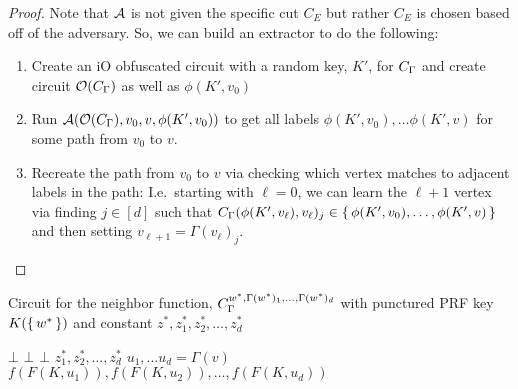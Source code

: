 \begin{lemma}
\begin{proof}
		Note that $\mathcal{A}$ is not given the specific cut $C_E$ but rather $C_E$ is chosen based off of the adversary.
		So, we can build an extractor to do the following:
		\begin{enumerate}
			\item Create an iO obfuscated circuit with a random key, $K'$, for $C_\Gamma$ and create circuit $\mathcal{O}(C_\Gamma)$
			as well as $\phi(K', v_0)$
			\item Run $\mathcal{A}(\mathcal{O}(C_\Gamma), v_0, v, \phi(K', v_0))$ to get all labels $\phi(K', v_0), \dots \phi(K', v)$
			for some path from $v_0$ to $v$.
			\item Recreate the path from $v_0$ to $v$ via checking which vertex matches to adjacent labels in the path:
			I.e.\ starting with $\ell = 0$, we can learn the $\ell + 1$ vertex via finding $j \in [d]$ such that
			$C_\Gamma(\phi(K', v_\ell), v_\ell)_j \in \set{\phi(K', v_0), \dots, \phi(K', v)}$
			 and then setting $v_{\ell + 1} = \Gamma(v_\ell)_j$.
		\end{enumerate}
	\end{proof}
\end{lemma}

\begin{algorithm}[H]
	\caption{
		Circuit for the neighbor function, $C_\Gamma^{w^*, \Gamma(w^*)_1, \dots, \Gamma(w^*)_d}$ with punctured PRF key
		$K(\set{w^*})$ and constant $z^*, z^*_1, z^*_2, \dots, z^*_d$
	}
	\begin{algorithmic}[1]
				\State \Return $\bot$
			\EndIf
				\State \Return $\bot$ 
			\EndIf
				\State \Return $\bot$
			\EndIf
				\State \Return $z^*_1, z^*_2, \dots, z^*_d$
			\EndIf
			\State $u_1, \dots u_d = \Gamma(v)$
			\State \Return $f(F(K, u_1)), f(F(K, u_2)), \dots, f(F(K, u_d))$
		\EndFunction
	\end{algorithmic}
	\label{alg:neighbHyb1}
\end{algorithm}

 



